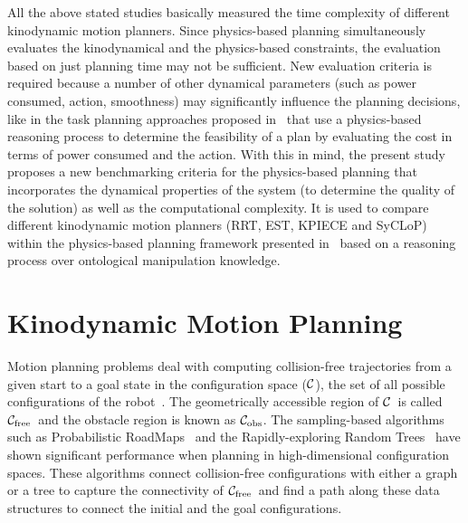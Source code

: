 \documentclass[runningheads,a4paper]{llncs}
\newcommand {\Cs}{\hbox{{$\cal C$}}}                %
\newcommand {\Cfree}{\hbox{{$\cal C_{\textrm{free}}$}}}                %
\newcommand {\Cobstacle}{\hbox{{$\cal C_{\textrm{obs}}$}}}                %
\begin{document}
All the above stated studies basically measured the time complexity of different kinodynamic motion planners. Since physics-based planning
simultaneously evaluates the kinodynamical and the physics-based constraints, the evaluation based on just planning time may not be sufficient.
New evaluation criteria is required because a number of other dynamical parameters (such as power consumed, action, smoothness) may significantly
influence the planning decisions, like in the task planning
approaches proposed in~\cite{Ali2015,RobotAli2015}  that use a physics-based reasoning process to determine the feasibility of a plan by evaluating the cost in terms of
power consumed and the action.
With this in mind, the present study proposes a new benchmarking
criteria for the physics-based planning that incorporates the dynamical properties of the system (to determine the
quality of the solution) as well as the computational complexity. It is used to compare different kinodynamic motion planners
(RRT, EST, KPIECE and SyCLoP)
within the physics-based planning framework presented in~\cite{muhayyuddin2015}  based on a reasoning process over ontological manipulation knowledge.

\section{Kinodynamic Motion Planning}\label{s-MotionPlanning}
Motion planning problems deal with computing collision-free trajectories from a given start to a goal state in the configuration space
(\Cs), the set of all possible configurations of the robot~\cite{Perez1983}.
The geometrically accessible region of \Cs\ is called \Cfree\ and the obstacle region is known as \Cobstacle.
The sampling-based algorithms such as Probabilistic RoadMaps~\cite{Kavraki1996} and the Rapidly-exploring Random Trees~\cite{lavalle2000} have shown  significant
performance when planning in high-dimensional configuration spaces. These algorithms connect collision-free configurations
 with either a graph or a tree to capture the connectivity of \Cfree\ and find a path along these data structures to connect the initial and the goal configurations.
\end{document}
